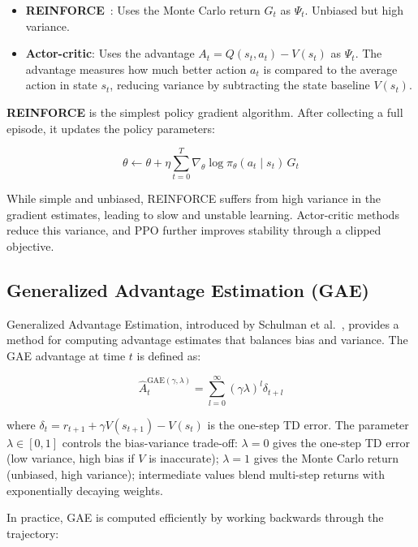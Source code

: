 \begin{itemize}
    \item \textbf{REINFORCE}~\cite{williams1992simple}: Uses the Monte Carlo return $G_t$ as $\Psi_t$. Unbiased but high variance.
    \item \textbf{Actor-critic}: Uses the advantage $A_t = Q(s_t, a_t) - V(s_t)$ as $\Psi_t$. The advantage measures how much better action $a_t$ is compared to the average action in state $s_t$, reducing variance by subtracting the state baseline $V(s_t)$.
\end{itemize}

\textbf{REINFORCE} is the simplest policy gradient algorithm. After collecting a full episode, it updates the policy parameters:

\begin{equation}
    \theta \leftarrow \theta + \eta \sum_{t=0}^{T} \nabla_\theta \log \pi_\theta(a_t \mid s_t) \, G_t
\end{equation}

While simple and unbiased, REINFORCE suffers from high variance in the gradient estimates, leading to slow and unstable learning. Actor-critic methods reduce this variance, and PPO further improves stability through a clipped objective.

\subsection{Generalized Advantage Estimation (GAE)}

Generalized Advantage Estimation, introduced by Schulman et al.~\cite{schulman2015gae}, provides a method for computing advantage estimates that balances bias and variance. The GAE advantage at time $t$ is defined as:

\begin{equation}
    \hat{A}_t^{\text{GAE}(\gamma, \lambda)} = \sum_{l=0}^{\infty} (\gamma \lambda)^l \delta_{t+l}
\end{equation}

where $\delta_t = r_{t+1} + \gamma V(s_{t+1}) - V(s_t)$ is the one-step TD error. The parameter $\lambda \in [0, 1]$ controls the bias-variance trade-off: $\lambda = 0$ gives the one-step TD error (low variance, high bias if $V$ is inaccurate); $\lambda = 1$ gives the Monte Carlo return (unbiased, high variance); intermediate values blend multi-step returns with exponentially decaying weights.

In practice, GAE is computed efficiently by working backwards through the trajectory:

